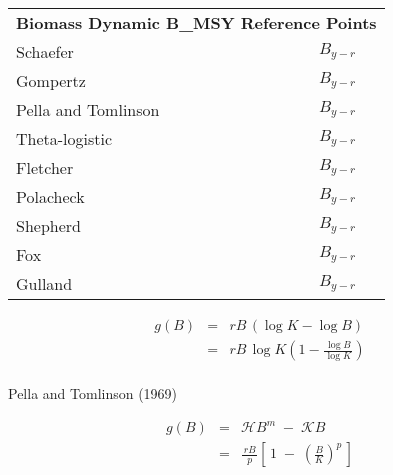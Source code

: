 \documentclass[11pt]{article}
\begin{document}
\begin{tabular}{lp{10cm}}
\multicolumn{2}{l}{\textbf{Biomass Dynamic B_{MSY} Reference Points}} \\
\addlinespace
Schaefer 		& \begin{equation} B_{y-r} \end{equation} \\
Gompertz		& \begin{equation} B_{y-r} \end{equation} \\
Pella and Tomlinson	& \begin{equation} B_{y-r} \end{equation} \\
Theta-logistic		& \begin{equation} B_{y-r} \end{equation} \\
Fletcher		& \begin{equation} B_{y-r} \end{equation} \\
Polacheck		& \begin{equation} B_{y-r} \end{equation} \\
Shepherd		& \begin{equation} B_{y-r} \end{equation} \\
Fox			& \begin{equation} B_{y-r} \end{equation} \\
Gulland			& \begin{equation} B_{y-r} \end{equation} \\
\bottomrule
\end{tabular}


\begin{eqnarray*}
  g(B) &=& rB\,(\log K\!-\!\log B)                                      \\[1em]
  ~    &=& rB\,\log K\!\left(1-\frac{\,\log B\,}{\log K}\right)         \\[1em]
\end{eqnarray*}


Pella and Tomlinson (1969)

\begin{eqnarray*}
  g(B) &=& \mathcal{H}B^m \;-\; \mathcal{K}B\\[1ex]
   ~   &=& \frac{\,rB\,}{p}\!
     \left[\,1 \;-\; \left(\frac{B}{K}\right)^{\!p}\,\right]
\end{eqnarray*}
\end{document}
